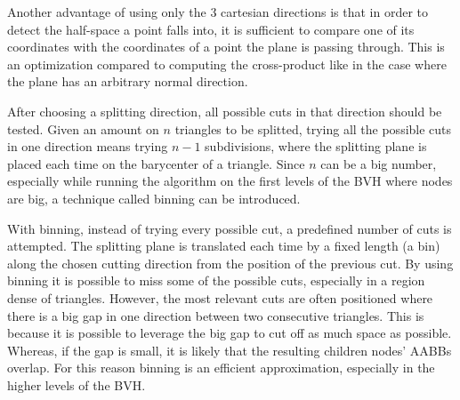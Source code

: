 \documentclass{PoliMi_MasterThesis}
\begin{document}
Another advantage of using only the 3 cartesian directions is that in order to detect the half-space a point falls into, it is sufficient to compare one of its coordinates with the coordinates of a point the plane is passing through. This is an optimization compared to computing the cross-product like in the case where the plane has an arbitrary normal direction.

After choosing a splitting direction, all possible cuts in that direction should be tested. Given an amount on $n$ triangles to be splitted, trying all the possible cuts in one direction means trying $n-1$ subdivisions, where the splitting plane is placed each time on the barycenter of a triangle. Since $n$ can be a big number, especially while running the algorithm on the first levels of the BVH where nodes are big, a technique called binning can be introduced.

With binning, instead of trying every possible cut, a predefined number of cuts is attempted. The splitting plane is translated each time by a fixed length (a bin) along the chosen cutting direction from the position of the previous cut. By using binning it is possible to miss some of the possible cuts, especially in a region dense of triangles. However, the most relevant cuts are often positioned where there is a big gap in one direction between two consecutive triangles. This is because it is possible to leverage the big gap to cut off as much space as possible. Whereas, if the gap is small, it is likely that the resulting children nodes' AABBs overlap. For this reason binning is an efficient approximation, especially in the higher levels of the BVH.
\end{document}

